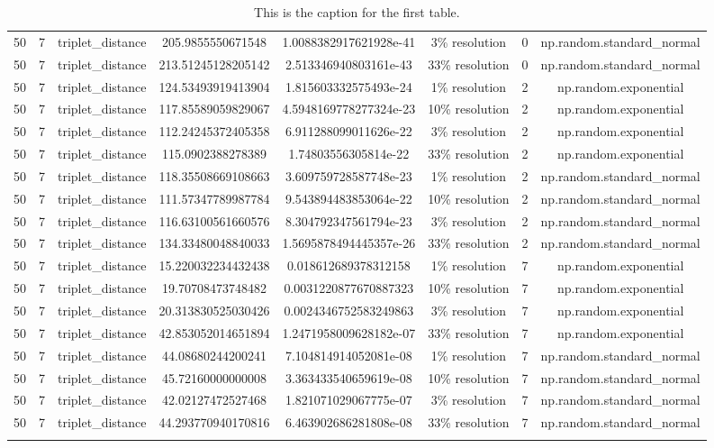 \begin{longtable}{||c c c c c c c c||}
         50 & 7 & triplet\_distance & 205.9855550671548 & 1.0088382917621928e-41 & 3\% resolution & 0 & np.random.standard\_normal \\
         50 & 7 & triplet\_distance & 213.51245128205142 & 2.513346940803161e-43 & 33\% resolution & 0 & np.random.standard\_normal \\
         50 & 7 & triplet\_distance & 124.53493919413904 & 1.815603332575493e-24 & 1\% resolution & 2 & np.random.exponential \\
         50 & 7 & triplet\_distance & 117.85589059829067 & 4.5948169778277324e-23 & 10\% resolution & 2 & np.random.exponential \\
         50 & 7 & triplet\_distance & 112.24245372405358 & 6.911288099011626e-22 & 3\% resolution & 2 & np.random.exponential \\
         50 & 7 & triplet\_distance & 115.0902388278389 & 1.74803556305814e-22 & 33\% resolution & 2 & np.random.exponential \\
         50 & 7 & triplet\_distance & 118.35508669108663 & 3.609759728587748e-23 & 1\% resolution & 2 & np.random.standard\_normal \\
         50 & 7 & triplet\_distance & 111.57347789987784 & 9.543894483853064e-22 & 10\% resolution & 2 & np.random.standard\_normal \\
         50 & 7 & triplet\_distance & 116.63100561660576 & 8.304792347561794e-23 & 3\% resolution & 2 & np.random.standard\_normal \\
        50 & 7 & triplet\_distance & 134.33480048840033 & 1.5695878494445357e-26 & 33\% resolution & 2 & np.random.standard\_normal \\
        50 & 7 & triplet\_distance & 15.220032234432438 & 0.018612689378312158 & 1\% resolution & 7 & np.random.exponential \\
        50 & 7 & triplet\_distance & 19.70708473748482 & 0.0031220877670887323 & 10\% resolution & 7 & np.random.exponential \\
        50 & 7 & triplet\_distance & 20.313830525030426 & 0.0024346752583249863 & 3\% resolution & 7 & np.random.exponential \\
        50 & 7 & triplet\_distance & 42.853052014651894 & 1.2471958009628182e-07 & 33\% resolution & 7 & np.random.exponential \\
        50 & 7 & triplet\_distance & 44.08680244200241 & 7.104814914052081e-08 & 1\% resolution & 7 & np.random.standard\_normal \\
        50 & 7 & triplet\_distance & 45.72160000000008 & 3.363433540659619e-08 & 10\% resolution & 7 & np.random.standard\_normal \\
        50 & 7 & triplet\_distance & 42.02127472527468 & 1.821071029067775e-07 & 3\% resolution & 7 & np.random.standard\_normal \\
        50 & 7 & triplet\_distance & 44.293770940170816 & 6.463902686281808e-08 & 33\% resolution & 7 & np.random.standard\_normal  \\ [1ex]
     \hline
    \caption{This is the caption for the first table.}
    \label{reconstruction-error-comparisons-between-regimes-stats:1}
  \end{longtable}
